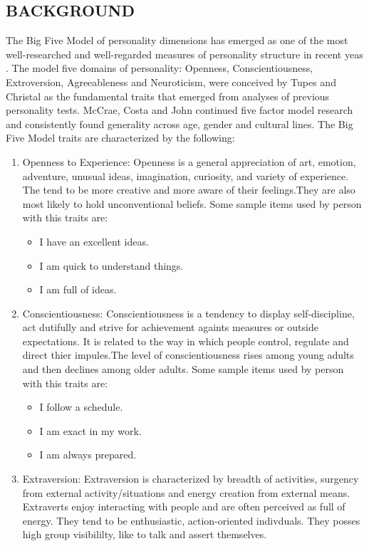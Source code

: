 \subsection{BACKGROUND}
The Big Five Model of personality dimensions has emerged as one of the most well-researched and well-regarded measures of personality structure in recent yeas \cite{fivefactormodel}. The model five domains of personality: Openness, Conscientiousness, Extroversion, Agreeableness and Neuroticism, were conceived by Tupes and Christal \cite{tupes} as the fundamental traits that emerged from analyses of previous personality tests. McCrae, Costa and John \cite{mccrae} continued five factor model research and consistently found generality across age, gender and cultural lines.
The Big Five Model traits are characterized by the following:
\begin{enumerate}
	\item Openness to Experience: Openness is a general appreciation of art, emotion, adventure, unusual ideas, imagination, curiosity, and variety of experience. The tend to be more creative and more aware of their feelings.They are also most likely to hold unconventional beliefs.
Some sample items used by person with this traits are:
\begin{itemize}
	\item I have an excellent ideas.
	\item I am quick to understand things.
	\item I am full of ideas.
\end{itemize}
\item Conscientiousness: Conscientiousness is a tendency to display self-discipline, act dutifully and strive for achievement againts measures or outside expectations. It is related to the way in which people control, regulate and direct thier impules.The level of conscientiousness rises among young adults and then declines among older adults.
Some sample items used by person with this traits are:
\begin{itemize}
	\item I follow a schedule.
	\item I am exact in my work.
	\item I am always prepared.
\end{itemize}
\item Extraversion: Extraversion is characterized by breadth of activities, surgency from external activity/situations and energy creation from external means. Extraverts enjoy interacting with people and are often perceived as full of energy. They tend to be enthusiastic, action-oriented indivduals. They posses high group visibililty, like to talk and assert themselves.

\end{enumerate}
